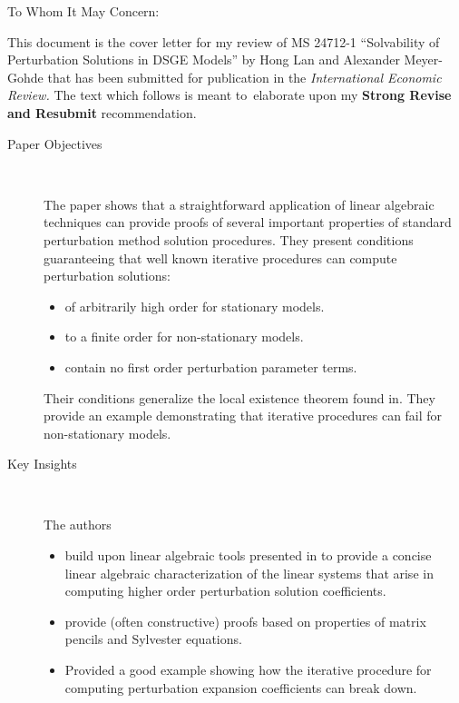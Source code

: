 \documentclass{article}
\makeatletter
\def\fullpath{\begingroup\everyeof{\noexpand}\@sanitize
  \edef\x{\@@input|"find `pwd` -name \jobname.tex" }%
  \edef\x{\endgroup\noexpand\zap@space\x\noexpand\@empty}\x}
\makeatother
\begin{document}
\begin{letter}{To Whom It May Concern:}



This document is the cover letter for my review of
MS 24712-1 ``Solvability of Perturbation Solutions in DSGE Models'' by Hong Lan and Alexander Meyer-Gohde that has been submitted for publication in 
the {\em International Economic Review.}
The text which follows is meant to\ elaborate upon my {\bf Strong Revise and Resubmit} recommendation.

\begin{description}
\item[Paper Objectives] \ 

The paper shows that a straightforward application of
linear algebraic techniques can provide proofs of several important properties
of standard perturbation method solution procedures.
They present 
conditions guaranteeing that well known iterative procedures can compute perturbation solutions:
  \begin{itemize}
  \item of arbitrarily high order for stationary models.
  \item to a finite order for non-stationary models.
  \item contain no first order perturbation parameter terms.
\end{itemize}
Their conditions generalize the local existence theorem found in\cite{jin02}.
They provide an example demonstrating that iterative procedures can fail for
non-stationary models.

\item[Key Insights] \ 

The authors 

\begin{itemize}
\item build upon linear algebraic tools presented in\cite{vetter1973} to provide
a concise linear algebraic characterization of the linear systems that
arise in computing higher order perturbation solution coefficients.
\item provide (often constructive) proofs based on properties of 
matrix pencils and Sylvester equations.
\item Provided a good example showing how the iterative procedure for computing
perturbation expansion coefficients can break down.
\end{itemize}


\end{description}
\end{letter}
\end{document}

